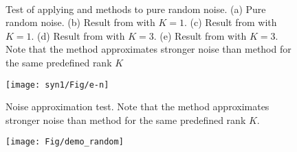 \begin{figure}[htb!]
  \centering
   \\
   \caption{Test of applying  and  methods to pure random noise. (a) Pure random noise. (b) Result from  with $K=1$. (c) Result from  with $K=1$. (d) Result from  with $K=3$. (e) Result from  with $K=3$. Note that the  method approximates stronger noise than  method for the same predefined rank $K$}
   \label{fig:syn1-nssat}
\end{figure}

\begin{figure}[htb!]
  \centering
  \texttt{[image: syn1/Fig/e-n]}        
   \caption{Noise approximation test. Note that the  method approximates stronger noise than  method for the same predefined rank $K$. }
   \label{fig:e-n}
\end{figure}

\begin{figure}[htb!]
  \centering
  \texttt{[image: Fig/demo\_random]}        
   \caption{}
   \label{fig:test_random}
\end{figure}


